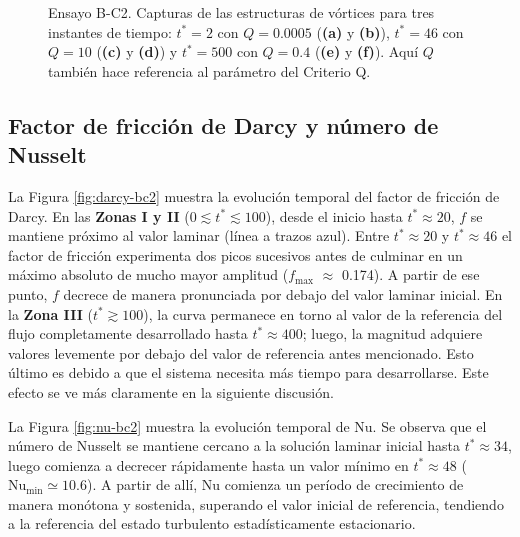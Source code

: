 \begin{figure} [H]
  
  \caption{Ensayo B-C2. Capturas de las estructuras de vórtices para tres instantes de tiempo: $t^* =2$ con $Q=0\text{.}0005$ (\textbf{(a)} y \textbf{(b)}), $t^* =46$ con $Q=10$ (\textbf{(c)} y \textbf{(d)}) y $t^* = 500$ con $Q=0\text{.}4$ (\textbf{(e)} y \textbf{(f)}). Aquí $Q$ también hace referencia al parámetro del Criterio Q. }
  \label{fig:mosaico2-bc2}
\end{figure}


\subsection{Factor de fricción de Darcy y número de Nusselt}
La Figura \ref{fig:darcy-bc2} muestra la evolución temporal del factor de fricción de Darcy. En las \textbf{Zonas I y II} ($0 \lesssim t^* \lesssim 100$), desde el inicio hasta $t^* \approx 20$, $f$ se mantiene próximo al valor laminar (línea a trazos azul). Entre $t^* \approx 20$ y $t^* \approx 46$ el factor de fricción experimenta dos picos sucesivos antes de culminar en un máximo absoluto de mucho mayor amplitud \linebreak ($f_{\max}$ $\approx$ 0.174). A partir de ese punto, $f$ decrece de manera pronunciada por debajo del valor \linebreak laminar inicial. En la \textbf{Zona III} ($t^* \gtrsim 100$), la curva permanece en torno al valor de la referencia del flujo completamente desarrollado hasta $t^* \approx 400$; luego, la magnitud adquiere valores levemente por debajo del valor de referencia antes mencionado. Esto último es debido a que el sistema necesita más tiempo para desarrollarse. Este efecto se ve más claramente en la siguiente discusión.

La Figura \ref{fig:nu-bc2} muestra la evolución temporal de Nu. Se observa que el número de Nusselt se mantiene cercano a la solución laminar inicial hasta $t^* \approx 34$, luego comienza a decrecer rápidamente hasta un valor mínimo en $t^* \approx 48$ ($\text{Nu}_{\text{min}} \simeq 10\text{.}6$). A partir de allí, Nu comienza un período de crecimiento de manera monótona y sostenida, superando el valor inicial de referencia, tendiendo a la referencia del estado turbulento estadísticamente estacionario. 

